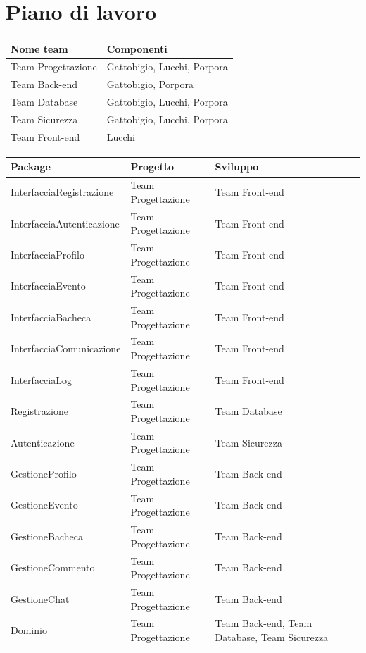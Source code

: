 \documentclass[12pt,a4paper]{report}
\begin{document}
\section{Piano di lavoro}
\begin{tabularx}{\textwidth}{|X|X|}
    \hline
    \rowcolor{studyColor} \textbf{Nome team} & \textbf{Componenti} \\ \hline
    \endhead
    Team Progettazione & Gattobigio, Lucchi, Porpora \\ \hline
    Team Back-end & Gattobigio, Porpora \\ \hline
    Team Database & Gattobigio, Lucchi, Porpora \\ \hline
    Team Sicurezza & Gattobigio, Lucchi, Porpora \\ \hline
    Team Front-end & Lucchi \\ \hline
\end{tabularx}
\vspace{0.5cm}
\begin{tabularx}{\textwidth}{|X|X|X|}
    \hline
    \rowcolor{studyColor} \textbf{Package} & \textbf{Progetto} & \textbf{Sviluppo} \\ \hline
    \endhead
    InterfacciaRegistrazione & Team Progettazione & Team Front-end \\ \hline
    InterfacciaAutenticazione & Team Progettazione & Team Front-end \\ \hline
    InterfacciaProfilo & Team Progettazione & Team Front-end \\ \hline
    InterfacciaEvento & Team Progettazione & Team Front-end \\ \hline
    InterfacciaBacheca & Team Progettazione & Team Front-end \\ \hline
    InterfacciaComunicazione & Team Progettazione & Team Front-end \\ \hline
    InterfacciaLog & Team Progettazione & Team Front-end \\ \hline
    Registrazione & Team Progettazione & Team Database \\ \hline
    Autenticazione & Team Progettazione & Team Sicurezza \\ \hline
    GestioneProfilo & Team Progettazione & Team Back-end \\ \hline
    GestioneEvento & Team Progettazione & Team Back-end \\ \hline
    GestioneBacheca & Team Progettazione & Team Back-end \\ \hline
    GestioneCommento & Team Progettazione & Team Back-end \\ \hline
    GestioneChat & Team Progettazione & Team Back-end \\ \hline
    Dominio & Team Progettazione & Team Back-end, Team Database, Team Sicurezza \\ \hline
\end{tabularx}
\end{document}
